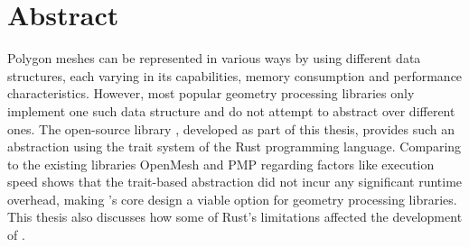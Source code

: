 \chapter*{\hfill Abstract}


Polygon meshes can be represented in various ways by using different data structures, each varying in its capabilities, memory consumption and performance characteristics.
However, most popular geometry processing libraries only implement one such data structure and do not attempt to abstract over different ones.
The open-source library , developed as part of this thesis, provides such an abstraction using the trait system of the Rust programming language.
Comparing  to the existing libraries OpenMesh and PMP regarding factors like execution speed shows that the trait-based abstraction did not incur any significant runtime overhead, making 's core design a viable option for geometry processing libraries.
This thesis also discusses how some of Rust's limitations affected the development of .




%





















